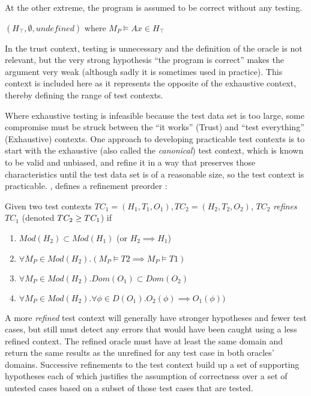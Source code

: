 At the other extreme, the program is assumed to be correct without any testing.

\begin{df} 
$(H_\top, \emptyset, undefined)$ where $M_P \models Ax \in H_\top$
\end{df}

\noindent In the trust context, 
testing is unnecessary and the definition of the oracle is not relevant,
but the very strong hypothesis ``the program is correct'' makes 
the argument very weak
(although sadly it is sometimes used in practice).
This context is included here as it represents the opposite of the exhaustive context,
thereby defining the range of test contexts.

Where exhaustive testing is infeasible because the test data set is too large, 
some compromise must be struck between 
the ``it works'' (Trust)  and ``test everything'' (Exhaustive) contexts.
One approach to developing practicable test contexts
is to start with the exhaustive (also called the \emph{canonical}) test context, 
which is known to be valid and unbiased,
and refine it in a way that preserves those characteristics
until the test data set is of a reasonable size,
so the test context is practicable.
\cite{BernotGaudelMarre1991}, defines a refinement preorder :

\begin{df}
Given two test contexts $TC_1 = (H_1, T_1, O_1), TC_2 = (H_2, T_2, O_2)$,
$TC_2$ \emph{refines} $TC_1$ (denoted $TC_2 \geq TC_1$) if

\begin{enumerate}
\item $ Mod(H_2) \subset Mod(H_1)$ (or $H_2 \implies H_1$)
\item $ \forall M_P \in Mod(H_2) . (M_P \models T2 \implies M_P \models T1)$
\item $ \forall M_P \in Mod(H_2) . Dom(O_1) \subset Dom(O_2)$
\item $ \forall M_P \in Mod(H_2) . \forall \phi \in D(O_1). O_2(\phi)  \implies O_1(\phi))$
\end{enumerate}

\end{df}

\noindent
A more \emph{refined} test context will generally have 
stronger hypotheses and fewer test cases,
but still must detect any errors that would have been caught using a less refined context.
The refined oracle must have at least the same domain and 
return the same results as the unrefined for any test case in both oracles' domains.
Successive refinements to the test context build up a set of supporting hypotheses
each of which justifies the assumption of correctness over a set of untested cases
based on a subset of those test cases that are tested.

